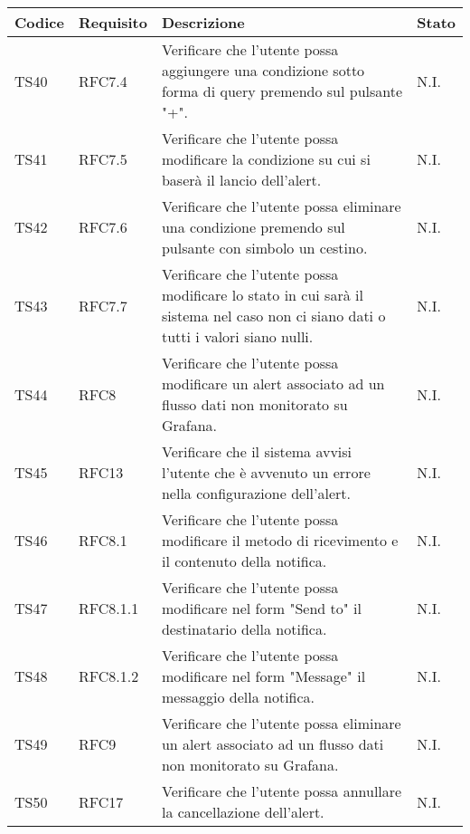 \begin{table}[!htpb]
	\centering
	\renewcommand{\arraystretch}{2} 
	\begin{tabular}{|l|l|p{10cm}|l|}
		\rowcolor{orange!50}
		\hline
		\textbf{Codice} & \textbf{Requisito}& \textbf{Descrizione} & \textbf{Stato}\\ 
		\hline
		TS40 & RFC7.4 &
			Verificare che l'utente possa aggiungere una condizione sotto forma di query premendo sul pulsante "+".
			& N.I.\\
		\hline
		TS41 & RFC7.5 &
			Verificare che l'utente possa modificare la condizione su cui si baserà il lancio dell’alert.
			& N.I.\\
		\hline
		TS42 & RFC7.6 &
			Verificare che l'utente possa eliminare una condizione premendo sul pulsante con simbolo un cestino.
			& N.I.\\
		\hline
		TS43 & RFC7.7 &
			Verificare che l'utente possa modificare lo stato in cui sarà il sistema nel caso non ci siano dati o tutti i valori siano nulli.
			& N.I.\\
		\hline
		TS44 & RFC8 &
			Verificare che l’utente possa modificare un alert associato ad un flusso dati non monitorato su Grafana.
			& N.I.\\
		\hline
		TS45 & RFC13 &
			Verificare che il sistema avvisi l’utente che è avvenuto un errore nella configurazione dell'alert.
			& N.I.\\
		\hline
		TS46 & RFC8.1 &
			Verificare che l’utente possa modificare il metodo di ricevimento e il contenuto della notifica. 
			& N.I.\\
		\hline
		TS47 & RFC8.1.1 &
			Verificare che l'utente possa modificare nel form "Send to" il destinatario della notifica.
			& N.I.\\
		\hline
		TS48 & RFC8.1.2 &
			Verificare che l'utente possa modificare nel form "Message" il messaggio della notifica.
			& N.I.\\
		\hline
		TS49 & RFC9 &
			Verificare che l’utente possa eliminare un alert associato ad un flusso dati non monitorato su Grafana. 
			& N.I.\\
		\hline
		TS50 & RFC17 &
			Verificare che l’utente possa annullare la cancellazione dell'alert.
			& N.I.\\
		\hline
	\end{tabular}
\end{table}
